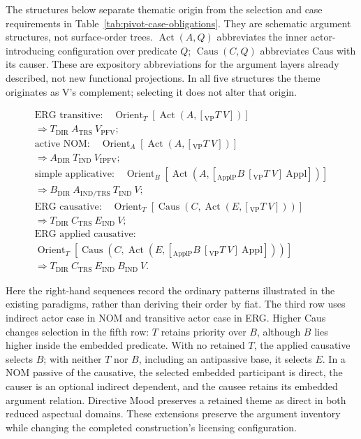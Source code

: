 The structures below separate thematic origin from the selection and case
requirements in Table~\ref{tab:pivot-case-obligations}. They are schematic
argument structures, not surface-order trees. $\operatorname{Act}(A,Q)$
abbreviates the inner actor-introducing configuration over predicate $Q$;
$\operatorname{Caus}(C,Q)$ abbreviates Caus with its causer. These are
expository abbreviations for the argument layers already described, not new
functional projections. In all five structures the theme originates as V's
complement; selecting it does not alter that origin.

\begin{gather*}
\text{ERG transitive:}\quad
 \operatorname{Orient}_{T}[\operatorname{Act}(A,[_{\mathrm{VP}}T\ V])]
 \\ \Rightarrow T_{\mathrm{DIR}}\ A_{\mathrm{TRS}}\ V_{\mathrm{PFV}};\\[3pt]
\text{active NOM:}\quad
 \operatorname{Orient}_{A}[\operatorname{Act}(A,[_{\mathrm{VP}}T\ V])]
 \\ \Rightarrow A_{\mathrm{DIR}}\ T_{\mathrm{IND}}\ V_{\mathrm{IPFV}};\\[3pt]
\text{simple applicative:}\quad
 \operatorname{Orient}_{B}[\operatorname{Act}(A,[_{\mathrm{ApplP}}B\ [_{\mathrm{VP}}T\ V]\ \mathrm{Appl}])]
 \\ \Rightarrow B_{\mathrm{DIR}}\ A_{\mathrm{IND/TRS}}\ T_{\mathrm{IND}}\ V;\\[3pt]
\text{ERG causative:}\quad
 \operatorname{Orient}_{T}[\operatorname{Caus}(C,\operatorname{Act}(E,[_{\mathrm{VP}}T\ V]))]
 \\ \Rightarrow T_{\mathrm{DIR}}\ C_{\mathrm{TRS}}\ E_{\mathrm{IND}}\ V;\\[3pt]
\text{ERG applied causative:}\\
 \operatorname{Orient}_{T}[\operatorname{Caus}(C,\operatorname{Act}(E,[_{\mathrm{ApplP}}B\ [_{\mathrm{VP}}T\ V]\ \mathrm{Appl}]))]
 \\ \Rightarrow T_{\mathrm{DIR}}\ C_{\mathrm{TRS}}\ E_{\mathrm{IND}}\ B_{\mathrm{IND}}\ V.
\end{gather*}

Here the right-hand sequences record the ordinary patterns illustrated in the
existing paradigms, rather than deriving their order by fiat. The third row
uses indirect actor case in NOM and transitive actor case in ERG. Higher Caus
changes selection in the fifth row: $T$ retains priority over $B$, although
$B$ lies higher inside the embedded predicate. With no retained $T$, the
applied causative selects $B$; with neither $T$ nor $B$, including an
antipassive base, it selects $E$. In a NOM passive of the causative, the
selected embedded participant is direct, the causer is an optional indirect
dependent, and the causee retains its embedded argument relation. Directive
Mood preserves a retained theme as direct in both reduced aspectual domains.
These extensions preserve the argument inventory while changing the completed
construction's licensing configuration.

